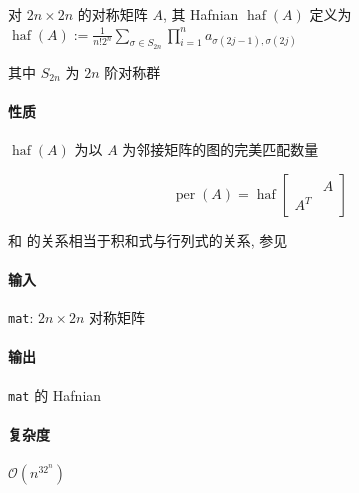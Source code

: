 对 \(2n\times 2n\) 的对称矩阵 \(A\), 其 Hafnian \(\operatorname{haf}(A)\) 定义为 \(\displaystyle\operatorname{haf}(A):=\frac{1}{n!2^n}\sum_{\sigma\in S_{2n}}\prod_{i=1}^n a_{\sigma(2j-1),\sigma(2j)}\)

其中 \(S_{2n}\) 为 \(2n\) 阶对称群

\paragraph{性质}

\(\operatorname{haf}(A)\) 为以 \(A\) 为邻接矩阵的图的完美匹配数量

\[
    \operatorname{per}(A)=\operatorname{haf}\begin{bmatrix}
            & A \\
        A^T &
    \end{bmatrix}
\]

和  的关系相当于积和式与行列式的关系, 参见 

\paragraph{输入}

\verb|mat|: \(2n\times 2n\) 对称矩阵

\paragraph{输出}

\verb|mat| 的 Hafnian

\paragraph{复杂度} \(\mathcal{O}(n^32^n)\)


